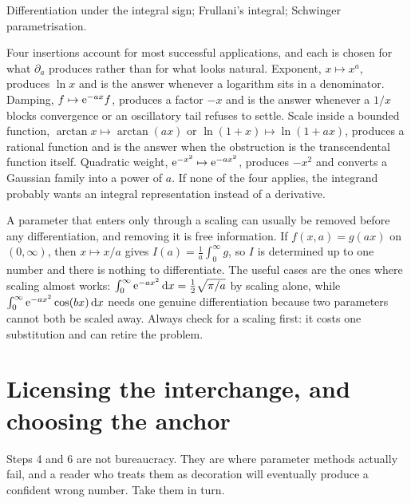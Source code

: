 \begin{seealsob}Differentiation under the integral sign; Frullani's integral; Schwinger parametrisation.\end{seealsob}

\begin{keynote}
Four insertions account for most successful applications, and each is chosen for what $\partial_a$ produces rather than for what looks natural. Exponent, $x\mapsto x^{a}$, produces $\ln x$ and is the answer whenever a logarithm sits in a denominator. Damping, $f\mapsto \mathrm{e}^{-ax}f$, produces a factor $-x$ and is the answer whenever a $1/x$ blocks convergence or an oscillatory tail refuses to settle. Scale inside a bounded function, $\arctan x\mapsto\arctan(ax)$ or $\ln(1+x)\mapsto\ln(1+ax)$, produces a rational function and is the answer when the obstruction is the transcendental function itself. Quadratic weight, $\mathrm{e}^{-x^{2}}\mapsto \mathrm{e}^{-ax^{2}}$, produces $-x^{2}$ and converts a Gaussian family into a power of $a$. If none of the four applies, the integrand probably wants an integral representation instead of a derivative.
\end{keynote}

\begin{keynote}
A parameter that enters only through a scaling can usually be removed before any differentiation, and removing it is free information. If $f(x,a)=g(ax)$ on $(0,\infty)$, then $x\mapsto x/a$ gives $I(a)=\tfrac1a\int_0^\infty g$, so $I$ is determined up to one number and there is nothing to differentiate. The useful cases are the ones where scaling almost works: $\int_0^\infty \mathrm{e}^{-ax^{2}}\,\mathrm{d} x=\tfrac12\sqrt{\pi/a}$ by scaling alone, while $\int_0^\infty \mathrm{e}^{-ax^{2}}\cos(bx)\,\mathrm{d} x$ needs one genuine differentiation because two parameters cannot both be scaled away. Always check for a scaling first: it costs one substitution and can retire the problem.
\end{keynote}

\section{Licensing the interchange, and choosing the anchor}

Steps 4 and 6 are not bureaucracy. They are where parameter methods actually fail, and a reader who treats them as decoration will eventually produce a confident wrong number. Take them in turn.

